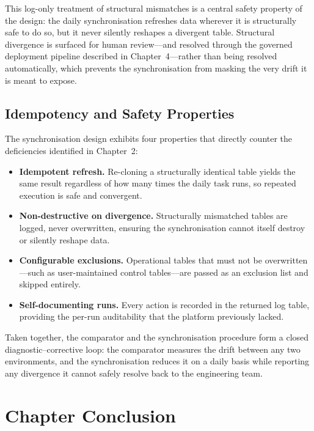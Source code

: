 This log-only treatment of structural mismatches is a central safety property of the design: the daily synchronisation refreshes data wherever it is structurally safe to do so, but it never silently reshapes a divergent table. Structural divergence is surfaced for human review---and resolved through the governed deployment pipeline described in Chapter~4---rather than being resolved automatically, which prevents the synchronisation from masking the very drift it is meant to expose.

\subsection{Idempotency and Safety Properties}
\label{subsec:sync-safety}

The synchronisation design exhibits four properties that directly counter the deficiencies identified in Chapter~2:

\begin{itemize}
  \item \textbf{Idempotent refresh.} Re-cloning a structurally identical table yields the same result regardless of how many times the daily task runs, so repeated execution is safe and convergent.
  \item \textbf{Non-destructive on divergence.} Structurally mismatched tables are logged, never overwritten, ensuring the synchronisation cannot itself destroy or silently reshape data.
  \item \textbf{Configurable exclusions.} Operational tables that must not be overwritten---such as user-maintained control tables---are passed as an exclusion list and skipped entirely.
  \item \textbf{Self-documenting runs.} Every action is recorded in the returned log table, providing the per-run auditability that the platform previously lacked.
\end{itemize}

Taken together, the comparator and the synchronisation procedure form a closed diagnostic--corrective loop: the comparator measures the drift between any two environments, and the synchronisation reduces it on a daily basis while reporting any divergence it cannot safely resolve back to the engineering team.

\section*{Chapter Conclusion}

